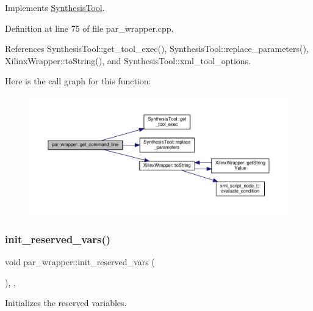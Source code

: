 Implements \hyperlink{classSynthesisTool_a8eb2ef7a6230a997a2467d298613c045}{Synthesis\+Tool}.



Definition at line 75 of file par\+\_\+wrapper.\+cpp.



References Synthesis\+Tool\+::get\+\_\+tool\+\_\+exec(), Synthesis\+Tool\+::replace\+\_\+parameters(), Xilinx\+Wrapper\+::to\+String(), and Synthesis\+Tool\+::xml\+\_\+tool\+\_\+options.

Here is the call graph for this function\+:
\nopagebreak
\begin{figure}[H]
\begin{center}
\leavevmode
\includegraphics[width=350pt]{d1/d07/classpar__wrapper_aee784dea142fbce12724b9da547d4e9f_cgraph}
\end{center}
\end{figure}
\mbox{\label{classpar__wrapper_a25c7424ba2105125054cad920450bc6e}} 
\subsubsection{\texorpdfstring{init\+\_\+reserved\+\_\+vars()}{init\_reserved\_vars()}}
{\footnotesize\ttfamily void par\+\_\+wrapper\+::init\+\_\+reserved\+\_\+vars (\begin{DoxyParamCaption}{ }\end{DoxyParamCaption})\hspace{0.3cm}{\ttfamily [override]}, {\ttfamily [protected]}, {\ttfamily [virtual]}}



Initializes the reserved variables. 



